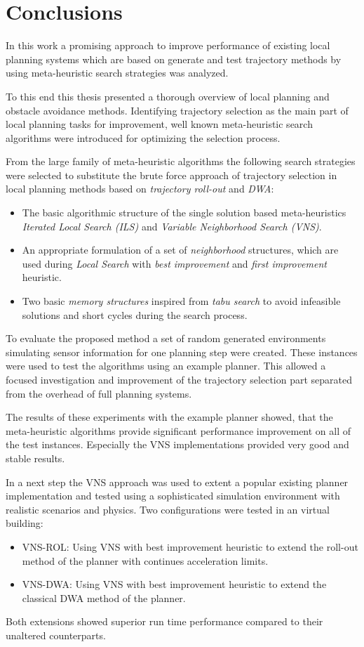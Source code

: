 \chapter{Conclusions}\label{ch:conc}
In this work a promising approach to improve performance of existing local planning systems which are based on generate and test trajectory methods by using meta-heuristic search strategies was analyzed.

To this end this thesis presented a thorough overview of local planning and obstacle avoidance methods. 
Identifying trajectory selection as the main part of local planning tasks for improvement, well known meta-heuristic search algorithms were introduced for optimizing the selection process.

From the large family of meta-heuristic algorithms the following search strategies were selected to substitute the brute force approach of trajectory selection in local planning methods based on \emph{trajectory roll-out} and \emph{DWA}:
\begin{itemize}
\item The basic algorithmic structure of the single solution based meta-heuristics \emph{Iterated Local Search (ILS)} and \emph{Variable Neighborhood Search (VNS)}.
\item An appropriate formulation of a set of \emph{neighborhood} structures, which are used during \emph{Local Search}  with \emph{best improvement} and \emph{first improvement} heuristic.
\item Two basic \emph{memory structures} inspired from \emph{tabu search} to avoid infeasible solutions and short cycles during the search process. 
\end{itemize}

To evaluate the proposed method a set of random generated environments simulating sensor information for one planning step were created. 
These instances were used to test the algorithms using an example planner. 
This allowed a focused investigation and improvement of the trajectory selection part separated from the overhead of full planning systems.

The results of these experiments with the example planner showed, that the meta-heuristic algorithms provide significant performance improvement on all of the test instances. Especially the VNS implementations provided very good and stable results. 

In a next step the VNS approach was used to extent a popular existing planner implementation and tested using a sophisticated simulation environment with realistic scenarios and physics. Two configurations were tested in an virtual building:
\begin{itemize}
\item VNS-ROL: Using VNS with best improvement heuristic to extend the roll-out method of the planner with continues acceleration limits.
\item VNS-DWA: Using VNS with best improvement heuristic to extend the classical DWA method of the planner.
\end{itemize}
Both extensions showed superior run time performance compared to their unaltered counterparts.

